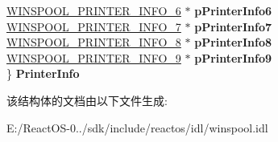 \begin{DoxyCompactItemize}
\begin{tabbing}
\>\hyperlink{struct___w_i_n_s_p_o_o_l___p_r_i_n_t_e_r___i_n_f_o__6}{WINSPOOL\_PRINTER\_INFO\_6} $\ast$ {\bfseries pPrinterInfo6}\\
\>\hyperlink{struct___w_i_n_s_p_o_o_l___p_r_i_n_t_e_r___i_n_f_o__7}{WINSPOOL\_PRINTER\_INFO\_7} $\ast$ {\bfseries pPrinterInfo7}\\
\>\hyperlink{struct___w_i_n_s_p_o_o_l___p_r_i_n_t_e_r___i_n_f_o__8}{WINSPOOL\_PRINTER\_INFO\_8} $\ast$ {\bfseries pPrinterInfo8}\\
\>\hyperlink{struct___w_i_n_s_p_o_o_l___p_r_i_n_t_e_r___i_n_f_o__9}{WINSPOOL\_PRINTER\_INFO\_9} $\ast$ {\bfseries pPrinterInfo9}\\
\} {\bfseries PrinterInfo}\\

\end{tabbing}\end{DoxyCompactItemize}


该结构体的文档由以下文件生成\+:\begin{DoxyCompactItemize}
\item 
E\+:/\+React\+O\+S-\/0../sdk/include/reactos/idl/winspool.\+idl\end{DoxyCompactItemize}
